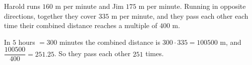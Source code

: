 Harold runs $160$ m per minute and Jim $175$ m per minute. Running in opposite directions, together they cover $335$ m per minute, and they pass each other each time their combined distance reaches a multiple of $400$ m.

In $5$ hours $=300$ minutes the combined distance is $300\cdot335=100500$ m, and $\dfrac{100500}{400}=251.25$. So they pass each other $\boxed{251}$ times.

